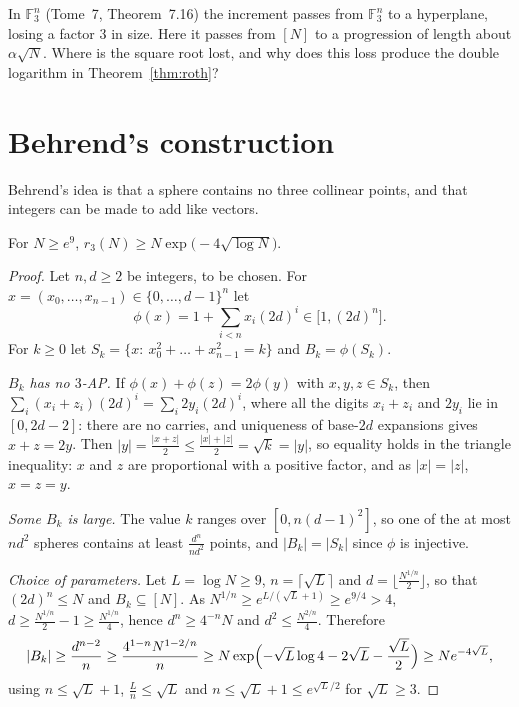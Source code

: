 \begin{think}
In $\mathbb F_3^n$ (Tome~7, Theorem~7.16) the increment passes from $\mathbb F_3^n$ to a hyperplane, losing a factor $3$ in size. Here it passes from $[N]$ to a progression of length about $\alpha\sqrt N$. Where is the square root lost, and why does this loss produce the double logarithm in Theorem~\ref{thm:roth}?
\end{think}

\section{Behrend's construction}

Behrend's idea is that a sphere contains no three collinear points, and that integers can be made to add like vectors.

\begin{theorem}[Behrend, 1946]\label{thm:behrend}
For $N\ge e^9$, $r_3(N)\ge N\exp\bigl(-4\sqrt{\log N}\bigr)$.
\end{theorem}
\begin{proof}
Let $n,d\ge2$ be integers, to be chosen. For $x=(x_0,\dots,x_{n-1})\in\{0,\dots,d-1\}^n$ let
\[
\phi(x)=1+\sum_{i<n}x_i(2d)^i\in\bigl[1,(2d)^n\bigr].
\]
For $k\ge0$ let $S_k=\{x:\ x_0^2+\dots+x_{n-1}^2=k\}$ and $B_k=\phi(S_k)$.

\emph{$B_k$ has no $3$-AP.} If $\phi(x)+\phi(z)=2\phi(y)$ with $x,y,z\in S_k$, then $\sum_i(x_i+z_i)(2d)^i=\sum_i2y_i(2d)^i$, where all the digits $x_i+z_i$ and $2y_i$ lie in $[0,2d-2]$: there are no carries, and uniqueness of base-$2d$ expansions gives $x+z=2y$. Then $|y|=\frac{|x+z|}2\le\frac{|x|+|z|}2=\sqrt k=|y|$, so equality holds in the triangle inequality: $x$ and $z$ are proportional with a positive factor, and as $|x|=|z|$, $x=z=y$.

\emph{Some $B_k$ is large.} The value $k$ ranges over $[0,n(d-1)^2]$, so one of the at most $nd^2$ spheres contains at least $\frac{d^n}{nd^2}$ points, and $|B_k|=|S_k|$ since $\phi$ is injective.

\emph{Choice of parameters.} Let $L=\log N\ge9$, $n=\lceil\sqrt L\rceil$ and $d=\lfloor\frac{N^{1/n}}2\rfloor$, so that $(2d)^n\le N$ and $B_k\subseteq[N]$. As $N^{1/n}\ge e^{L/(\sqrt L+1)}\ge e^{9/4}>4$, $d\ge\frac{N^{1/n}}2-1\ge\frac{N^{1/n}}4$, hence $d^n\ge4^{-n}N$ and $d^2\le\frac{N^{2/n}}4$. Therefore
\[
|B_k|\ge\frac{d^{n-2}}n\ge\frac{4^{1-n}N^{1-2/n}}n\ge N\exp\Bigl(-\sqrt L\log4-2\sqrt L-\frac{\sqrt L}2\Bigr)\ge Ne^{-4\sqrt L},
\]
using $n\le\sqrt L+1$, $\frac Ln\le\sqrt L$ and $n\le\sqrt L+1\le e^{\sqrt L/2}$ for $\sqrt L\ge3$.
\end{proof}

